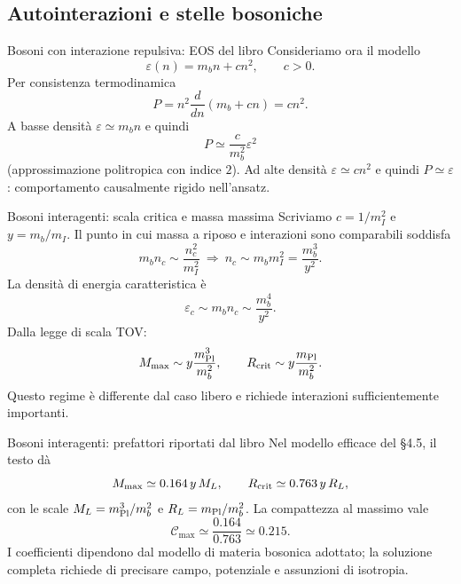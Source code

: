 \subsection{Autointerazioni e stelle bosoniche}

\begin{frame}[t]{Bosoni con interazione repulsiva: EOS del libro}
\small
Consideriamo ora il modello
\[
\varepsilon(n)=m_bn+cn^2,\qquad c>0.
\]
Per consistenza termodinamica
\[
P=n^2\frac{d}{dn}\left(m_b+cn\right)=cn^2.
\]
A basse densità $\varepsilon\simeq m_bn$ e quindi
\[
P\simeq\frac c{m_b^2}\varepsilon^2
\]
(approssimazione politropica con indice $2$).
\medskip
Ad alte densità $\varepsilon\simeq cn^2$ e quindi $P\simeq\varepsilon$: comportamento causalmente rigido nell'ansatz.
\end{frame}

\begin{frame}[t]{Bosoni interagenti: scala critica e massa massima}
\small
Scriviamo $c=1/m_I^2$ e $y=m_b/m_I$. Il punto in cui massa a riposo e interazioni sono comparabili soddisfa
\[
m_bn_c\sim\frac{n_c^2}{m_I^2}
\ \Longrightarrow\ n_c\sim m_bm_I^2
=\frac{m_b^3}{y^2}.
\]
La densità di energia caratteristica è
\[
\varepsilon_c\sim m_bn_c\sim\frac{m_b^4}{y^2}.
\]
Dalla legge di scala TOV:
\[
M_{\max}\sim y\frac{m_{\rm Pl}^3}{m_b^2},
\qquad R_{\rm crit}\sim y\frac{m_{\rm Pl}}{m_b^2}.
\]
Questo regime è differente dal caso libero e richiede interazioni sufficientemente importanti.
\end{frame}

\begin{frame}[t]{Bosoni interagenti: prefattori riportati dal libro}
\small
Nel modello efficace del §4.5, il testo dà
\[
M_{\max}\simeq0.164\,y\,M_L,
\qquad R_{\rm crit}\simeq0.763\,y\,R_L,
\]
con le scale $M_L=m_{\rm Pl}^3/m_b^2$ e $R_L=m_{\rm Pl}/m_b^2$.
\medskip
La compattezza al massimo vale
\[
\mathcal C_{\max}\simeq\frac{0.164}{0.763}\simeq0.215.
\]
I coefficienti dipendono dal modello di materia bosonica adottato; la soluzione completa richiede di precisare campo, potenziale e assunzioni di isotropia.
\end{frame}

